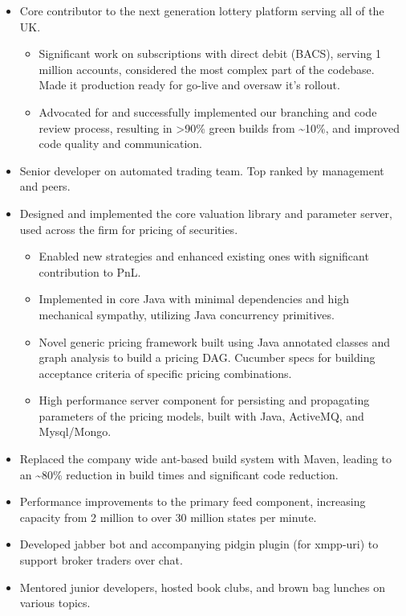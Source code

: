 \documentclass[11pt,a4paper,roman]{moderncv}
\begin{document}
\vspace{5mm}

\begin{itemize}
\item Core contributor to the next generation lottery platform serving all of the UK.
  \begin{itemize}
  \item Significant work on subscriptions with direct debit (BACS), serving 1 million accounts, considered the most complex part of the codebase. Made it production ready for go-live and oversaw it's rollout.
  \item Advocated for and successfully implemented our branching and code review process, resulting in >90\% green builds from \textasciitilde10\%, and improved code quality and communication.
  \end{itemize}
\end{itemize}

\vspace{5mm}

\clearpage
{}
\begin{itemize}
\item Senior developer on automated trading team. Top ranked by management and peers.
\item Designed and implemented the core valuation library and parameter server, used across the firm for pricing of securities.
  \begin{itemize}
  \item Enabled new strategies and enhanced existing ones with significant contribution to PnL.
  \item Implemented in core Java with minimal dependencies and high mechanical sympathy, utilizing Java concurrency primitives.
  \item Novel generic pricing framework built using Java annotated classes and graph analysis to build a pricing DAG. Cucumber specs for building acceptance criteria of specific pricing combinations.
  \item High performance server component for persisting and propagating parameters of the pricing models, built with Java, ActiveMQ, and Mysql/Mongo.
  \end{itemize}
\item Replaced the company wide ant-based build system with Maven, leading to an \textasciitilde80\% reduction in build times and significant code reduction.
\item Performance improvements to the primary feed component, increasing capacity from 2 million to over 30 million states per minute.
\item Developed jabber bot and accompanying pidgin plugin (for xmpp-uri) to support broker traders over chat.
\item Mentored junior developers, hosted book clubs, and brown bag lunches on various topics.
\end{itemize}
\end{document}
